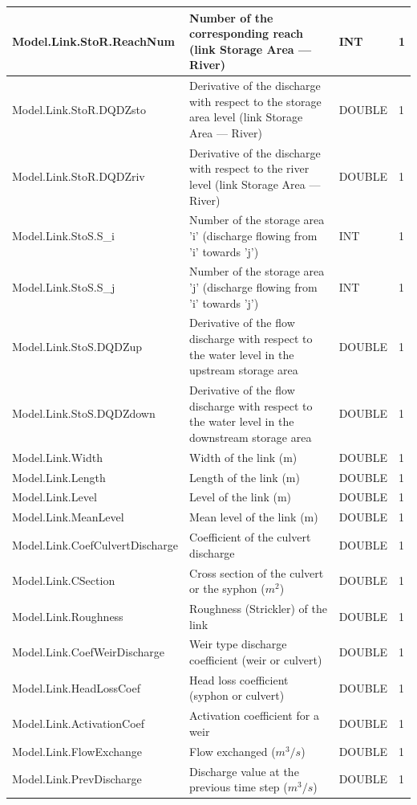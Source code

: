 \documentclass[a4paper,11pt]{article}
\begin{document}
\begin{landscape}
\begin{table}[ht]
\begin{center}
\begin{tabular}{|l|l|l|l|}
\hline  Model.Link.StoR.ReachNum & Number of the corresponding reach (link Storage Area --- River) & INT & 1 \\
\hline  Model.Link.StoR.DQDZsto & Derivative of the discharge with respect to the storage area level (link Storage Area --- River) & DOUBLE & 1 \\
\hline  Model.Link.StoR.DQDZriv & Derivative of the discharge with respect to the river level (link Storage Area --- River) & DOUBLE & 1 \\
\hline  Model.Link.StoS.S\_i & Number of the storage area 'i' (discharge flowing from 'i' towards 'j') & INT & 1 \\
\hline  Model.Link.StoS.S\_j & Number of the storage area 'j' (discharge flowing from 'i' towards 'j') & INT & 1 \\
\hline  Model.Link.StoS.DQDZup & Derivative of the flow discharge with respect to the water level in the upstream storage area & DOUBLE & 1 \\
\hline  Model.Link.StoS.DQDZdown & Derivative of the flow discharge with respect to the water level in the downstream storage area & DOUBLE & 1 \\
\hline  Model.Link.Width & Width of the link (m) & DOUBLE & 1 \\
\hline  Model.Link.Length & Length of the link (m) & DOUBLE & 1 \\
\hline  Model.Link.Level & Level of the link (m) & DOUBLE & 1 \\
\hline  Model.Link.MeanLevel & Mean level of the link (m) & DOUBLE & 1 \\
\hline  Model.Link.CoefCulvertDischarge & Coefficient of the culvert discharge & DOUBLE & 1 \\
\hline  Model.Link.CSection & Cross section of the culvert or the syphon ($m^2$) & DOUBLE & 1 \\
\hline  Model.Link.Roughness & Roughness (Strickler) of the link & DOUBLE & 1 \\
\hline  Model.Link.CoefWeirDischarge & Weir type discharge coefficient (weir or culvert) & DOUBLE & 1 \\
\hline  Model.Link.HeadLossCoef & Head loss coefficient (syphon or culvert) & DOUBLE & 1 \\
\hline  Model.Link.ActivationCoef & Activation coefficient for a weir & DOUBLE & 1 \\
\hline  Model.Link.FlowExchange & Flow exchanged ($m^3/s$) & DOUBLE & 1 \\
\hline  Model.Link.PrevDischarge & Discharge value at the previous time step ($m^3/s$) & DOUBLE & 1 \\

\end{tabular}
\end{center}
\end{table}
\end{landscape}
\end{document}
